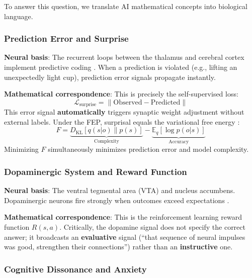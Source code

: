 \documentclass[pdflatex,sn-mathphys-num]{sn-jnl}
\theoremstyle{thmstyleone}%
\theoremstyle{thmstyletwo}%
\theoremstyle{thmstylethree}%
\begin{document}
To answer this question, we translate AI mathematical concepts into biological language.

\subsubsection{Prediction Error and Surprise}

\textbf{Neural basis}: The recurrent loops between the thalamus and cerebral cortex implement predictive coding \cite{friston2022active}. When a prediction is violated (e.g., lifting an unexpectedly light cup), prediction error signals propagate instantly.

\textbf{Mathematical correspondence}: This is precisely the self-supervised loss:
\begin{equation}\label{eq:surprise_loss}
\mathcal{L}_{\text{surprise}} = \| \text{Observed} - \text{Predicted} \|
\end{equation}
This error signal \textbf{automatically} triggers synaptic weight adjustment without external labels. Under the FEP, surprisal equals the variational free energy \cite{friston2022active}:
\begin{equation}\label{eq:free_energy}
F = \underbrace{D_{\text{KL}}[q(s|o) \| p(s)]}_{\text{Complexity}} - \underbrace{\mathbb{E}_q[\log p(o|s)]}_{\text{Accuracy}}
\end{equation}
Minimizing $F$ simultaneously minimizes prediction error and model complexity.

\subsubsection{Dopaminergic System and Reward Function}

\textbf{Neural basis}: The ventral tegmental area (VTA) and nucleus accumbens. Dopaminergic neurons fire strongly when outcomes exceed expectations \cite{friston2022active}.

\textbf{Mathematical correspondence}: This is the reinforcement learning reward function $R(s,a)$. Critically, the dopamine signal does not specify the correct answer; it broadcasts an \textbf{evaluative} signal (``that sequence of neural impulses was good, strengthen their connections'') rather than an \textbf{instructive} one.

\subsubsection{Cognitive Dissonance and Anxiety}
\end{document}
